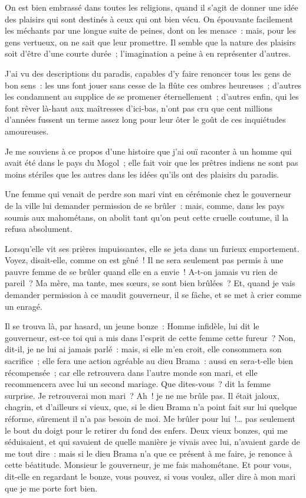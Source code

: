 \documentclass[french,twoside]{book} %
\begin{document}
\noindent On est bien embrassé dans toutes les religions, quand il s’agit de donner une idée des plaisirs qui sont destinés à ceux qui ont bien vécu. On épouvante facilement les méchants par une longue suite de peines, dont on les menace : mais, pour les gens vertueux, on ne sait que leur promettre. Il semble que la nature des plaisirs soit d’être d’une courte durée ; l’imagination a peine à en représenter d’autres.\par
J’ai vu des descriptions du paradis, capables d’y faire renoncer tous les gens de bon sens : les uns font jouer sans cesse de la flûte ces ombres heureuses ; d’autres les condamnent au supplice de se promener éternellement ; d’autres enfin, qui les font rêver là-haut aux maîtresses d’ici-bas, n’ont pas cru que cent millions d’années fussent un terme assez long pour leur ôter le goût de ces inquiétudes amoureuses.\par
Je me souviens à ce propos d’une histoire que j’ai ouï raconter à un homme qui avait été dans le pays du Mogol ; elle fait voir que les prêtres indiens ne sont pas moins stériles que les autres dans les idées qu’ils ont des plaisirs du paradis.\par
Une femme qui venait de perdre son mari vint en cérémonie chez le gouverneur de la ville lui demander permission de se brûler : mais, comme, dans les pays soumis aux mahométans, on abolit tant qu’on peut cette cruelle coutume, il la refusa absolument.\par
Lorsqu’elle vit ses prières impuissantes, elle se jeta dans un furieux emportement. Voyez, disait-elle, comme on est gêné ! Il ne sera seulement pas permis à une pauvre femme de se brûler quand elle en a envie ! A-t-on jamais vu rien de pareil ? Ma mère, ma tante, mes sœurs, se sont bien brûlées ? Et, quand je vais demander permission à ce maudit gouverneur, il se fâche, et se met à crier comme un enragé.\par
Il se trouva là, par hasard, un jeune bonze : Homme infidèle, lui dit le gouverneur, est-ce toi qui a mis dans l’esprit de cette femme cette fureur ? Non, dit-il, je ne lui ai jamais parlé : mais, si elle m’en croit, elle consommera son sacrifice ; elle fera une action agréable au dieu Brama : aussi en sera-t-elle bien récompensée ; car elle retrouvera dans l’autre monde son mari, et elle recommencera avec lui un second mariage. Que dites-vous ? dit la femme surprise. Je retrouverai mon mari ? Ah ! je ne me brûle pas. Il était jaloux, chagrin, et d’ailleurs si vieux, que, si le dieu Brama n’a point fait sur lui quelque réforme, sûrement il n’a pas besoin de moi. Me brûler pour lui !… pas seulement le bout du doigt pour le retirer du fond des enfers. Deux vieux bonzes, qui me séduisaient, et qui savaient de quelle manière je vivais avec lui, n’avaient garde de me tout dire : mais si le dieu Brama n’a que ce présent à me faire, je renonce à cette béatitude. Monsieur le gouverneur, je me fais mahométane. Et pour vous, dit-elle en regardant le bonze, vous pouvez, si vous voulez, aller dire à mon mari que je me porte fort bien.\par
\end{document}
